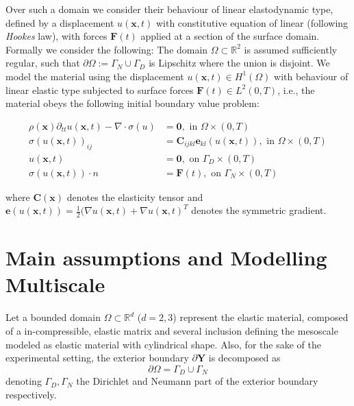 Over such a domain we consider their behaviour of linear elastodynamic type, defined by a displacement $u(\mathbf{x},t)$ with constitutive equation of linear (following \textit{Hookes} law), with forces $\mathbf{F}(t)$ applied at a section of the surface domain. \\

Formally we consider the following:
The domain $\Omega \subset \mathbb{R}^2$ is assumed sufficiently regular, such that $\partial \Omega := \Gamma_N \cup \Gamma_D$ is Lipschitz where the union is disjoint.
We model the material using the displacement $u(\mathbf{x},t) \in H^1(\Omega)$ with behaviour of linear elastic type subjected to surface forces $\mathbf{F}(t) \in L^2 (0, T)$, i.e., the material obeys the following initial boundary value problem:

\begin{align*}
    \rho (\mathbf{x}) \partial_{tt} u(\mathbf{x},t) - \nabla \cdot \sigma (u) & = \mathbf{0}, \text{ in } \Omega \times (0, T) \\
    \sigma(u(\mathbf{x},t))_{ij} &= \mathbf{C}_{ijkl} \mathbf{e}_{kl}(u(\mathbf{x},t)), \text{ in } \Omega \times (0, T) \\
    u(\mathbf{x},t) &= \mathbf{0}, \text{ on } \Gamma_D \times (0, T) \\
    \sigma(u(\mathbf{x},t)) \cdot n &= \mathbf{F}(t), \text{ on } \Gamma_N \times (0,T)
\end{align*}

where $\mathbf{C}(\mathbf{x})$ denotes the elasticity tensor and $\mathbf{e}(u(\mathbf{x},t)) = \frac{1}{2}\big( \nabla u(\mathbf{x},t) + \nabla u(\mathbf{x},t)^{T}$ denotes the symmetric gradient.

\section{Main assumptions and Modelling Multiscale}
Let a bounded domain $\Omega \subset \mathbb{R}^d$ ($d = 2,3$) represent the elastic material, composed of a in-compressible, elastic matrix and several inclusion defining the mesoscale modeled as elastic material with cylindrical shape. 
Also, for the sake of the experimental setting, the exterior boundary $\partial \mathbf{Y}$ is decomposed as
\begin{equation*}
	\partial \Omega = \Gamma_D \cup \Gamma_N
\end{equation*}
denoting $\Gamma_D, \Gamma_N$ the Dirichlet and Neumann part of the exterior boundary respectively. 

